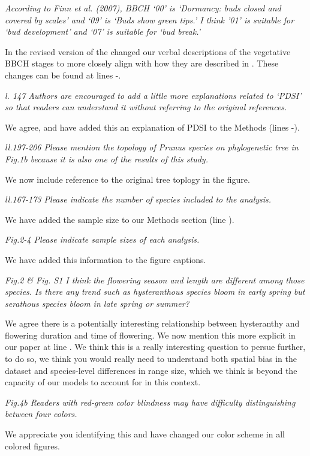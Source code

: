\documentclass{article}[12pt]
\begin{document}
\emph{According to Finn et al. (2007), BBCH ‘00’ is ‘Dormancy: buds closed and covered by scales’ and ‘09’ is ‘Buds show green tips.’ I think ’01’ is suitable for ‘bud development’ and ‘07’ is suitable for ‘bud break.’}

In the revised version of the changed our verbal descriptions of the vegetative BBCH stages to more closely align with how they are described in \citet{Finn2007}. These changes can be found at lines -.

\emph{l. 147 Authors are encouraged to add a little more explanations related to ‘PDSI’ so that readers can understand it without referring to the original references.}

We agree, and have added this an explanation of PDSI to the Methods (lines -).

\emph{ll.197-206 Please mention the topology of Prunus species on phylogenetic tree in Fig.1b because it is also one of the results of this study.}

We now include reference to the original tree toplogy in the figure.

\emph{ll.167-173 Please indicate the number of species included to the analysis.}

We have added the sample size to our Methods section (line ).

\emph{Fig.2-4 Please indicate sample sizes of each analysis.}

We have added this information to the figure captions.

\emph{Fig.2 & Fig. S1 I think the flowering season and length are different among those species. Is there any trend such as hysteranthous species bloom in early spring but serathous species bloom in late spring or summer?}

We agree there is a potentially interesting relationship between hysteranthy and flowering duration and time of flowering. We now mention this more explicit in our paper at line . We think this is a really interesting question to persue further, to do so, we think you would really need to understand both spatial bias in the dataset and  species-level differences in range size, which we think is beyond the capacity of our models to account for in this context. 

\emph{Fig.4b Readers with red-green color blindness may have difficulty distinguishing between four colors.}

We appreciate you identifying this and have changed our color scheme in all colored figures.
\end{document}
